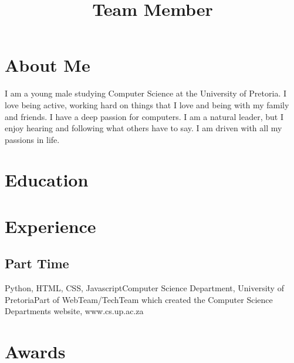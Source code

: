 \documentclass[11pt,a4paper,sans]{moderncv} %
\title{Team Member}
\begin{document}
\makecvtitle %

\section{About Me}
I am a young male studying Computer Science at the University of Pretoria. I love being active, working hard on things that I love and being with my family and friends. I have a deep passion for computers. I am a natural leader, but I enjoy hearing and following what others have to say. I am driven with all my passions in life.



\section{Education}


\section{Experience}
\subsection{Part Time}
  {Python, HTML, CSS, Javascript}{Computer Science Department, University of Pretoria}{Part of WebTeam/TechTeam which created the Computer Science Departments website, www.cs.up.ac.za}{}{}




\section{Awards}

\end{document}
